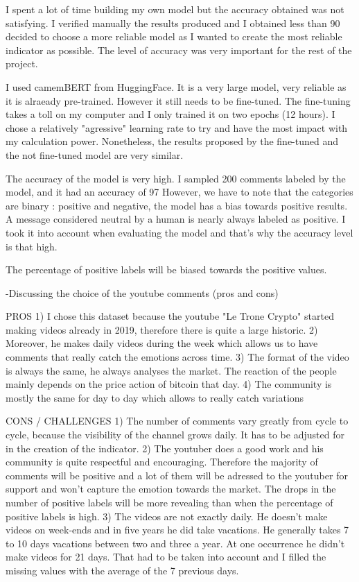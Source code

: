 I spent a lot of time building my own model but the accuracy obtained was not satisfying. I verified manually the results produced and I obtained 
less than 90%
decided to choose a more reliable model as I wanted to create the most reliable indicator as possible. The level of accuracy was very important 
for the rest of the project.

I used camemBERT from HuggingFace. It is a very large model, very reliable as it is alraeady pre-trained. However it still needs to be fine-tuned.
The fine-tuning takes a toll on my computer and I only trained it on two epochs (12 hours). I chose a relatively "agressive" learning 
rate to try and have the most impact with my calculation power. Nonetheless, the results proposed by the fine-tuned and the not fine-tuned model are
very similar.

The accuracy of the model is very high. I sampled 200 comments labeled by the model, and it had an accuracy of 97%
However, we have to note that the categories are binary : positive and negative, the model has a bias towards positive results. A message considered
neutral by a human is nearly always labeled as positive. I took it into account when evaluating the model and that's why the accuracy level is 
that high.

The percentage of positive labels will be biased towards the positive values.


-Discussing the choice of the youtube comments (pros and cons)

PROS
1) I chose this dataset because the youtube "Le Trone Crypto" started making videos already in 2019, therefore there is quite a large historic.
2) Moreover, he makes daily videos during the week which allows us to have comments that really catch the emotions across time.
3) The format of the video is always the same, he always analyses the market. The reaction of the people mainly depends on the price action of bitcoin
that day.
4) The community is mostly the same for day to day which allows to really catch variations 

CONS / CHALLENGES 
1) The number of comments vary greatly from cycle to cycle, because the visibility of the channel grows daily. It has to be adjusted for in the 
creation of the indicator.
2) The youtuber does a good work and his community is quite respectful and encouraging. Therefore the majority of comments will be positive and
a lot of them will be adressed to the youtuber for support and won't capture the emotion towards the market. The drops in the number of positive labels 
will be more revealing than when the percentage of positive labels is high.
3) The videos are not exactly daily. He doesn't make videos on week-ends and in five years he did take vacations. He generally takes 7 to 10 days vacations
between two and three a year. At one occurrence he didn't make videos for 21 days. That had to be taken into account and I filled the missing values
with the average of the 7 previous days.


